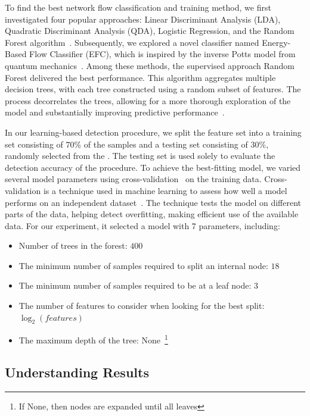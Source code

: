 To find the best network flow classification and training method, we first investigated four popular approaches: Linear Discriminant Analysis (LDA), Quadratic Discriminant Analysis (QDA), Logistic Regression, and the Random Forest algorithm~\cite{james2023introduction}. Subsequently, we explored a novel classifier named Energy-Based Flow Classifier (EFC), which is inspired by the inverse Potts model from quantum mechanics~\cite{DBLP:journals/tnsm/PontesSGBM21}. Among these methods, the supervised approach Random Forest delivered the best performance. This algorithm aggregates multiple decision trees, with each tree constructed using a random subset of features. The process decorrelates the trees, allowing for a more thorough exploration of the model and substantially improving predictive performance~\cite{james2023introduction}.

In our learning-based detection procedure, we split the feature set into a training set consisting of $70$\% of the samples and a testing set consisting of $30$\%, randomly selected from the \cds. The testing set is used solely to evaluate the detection accuracy of the procedure. To achieve the best-fitting model, we varied several model parameters using cross-validation~\cite{DBLP:phd/us/Stephenson22} on the training data. Cross-validation is a technique used in machine learning to assess how well a model performs on an independent dataset~\cite{DBLP:journals/jsan/AwadF23}. The technique tests the model on different parts of the data, helping detect overfitting, making efficient use of the available data. For our experiment, it selected a model with 7 parameters, including:

\begin{itemize}
    \item Number of trees in the forest: $400$
    \item The minimum number of samples required to split an internal node: $18$
    \item The minimum number of samples required to be at a leaf node: $3$
    \item The number of features to consider when looking for the best split: $\log_2(features)$
    \item The maximum depth of the tree: None~\footnote{If None, then nodes are expanded until all leaves}
\end{itemize}

\subsection{Understanding Results}\label{sec:understand}


